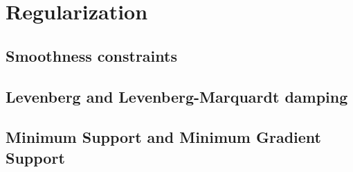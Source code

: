 \section{Regularization}\label{sect:crtomo_reg}
\subsection{Smoothness constraints}\label{sub:crtomo_reg_smooth}
\subsection{Levenberg and Levenberg-Marquardt damping}\label{sub:crtomo_reg_lma}
\subsection{Minimum Support and Minimum Gradient Support}\label{sub:crtomo_reg_mgs}
